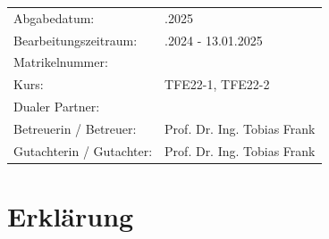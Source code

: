 \documentclass{scrbook} %
\newcommand{\abgabe}{13.01.2025}
\newcommand{\bearbeitungszeitraum}{09.10.2024 - 13.01.2025}
\newcommand{\matrikelnr}{5726700}
\newcommand{\kurs}{TFE22-1, TFE22-2}
\newcommand{\firma}{}
\newcommand{\betreuerfirma}{Prof. Dr. Ing. Tobias Frank}
\newcommand{\gutachterdhbw}{Prof. Dr. Ing. Tobias Frank}
\newcommand{\jahr}{2025} %
\begin{document}
\begin{titlepage}
\begin{center}
{\fontsize{12pt}{14pt}\selectfont
\begin{tabular}{ll}
Abgabedatum:                    & \quad \abgabe \\
Bearbeitungszeitraum:           & \quad \bearbeitungszeitraum \\
Matrikelnummer:                 & \quad \matrikelnr \\
Kurs:                           & \quad \kurs \\
Dualer Partner:                 & \quad \firma \\ %
Betreuerin / Betreuer:          & \quad \betreuerfirma \\ %
Gutachterin / Gutachter:        & \quad \gutachterdhbw \\ [2ex]
\end{tabular}
}
\end{center}


\end{titlepage}

%

\hypersetup{pageanchor=true}


\chapter*{Erklärung} %
\end{document}
